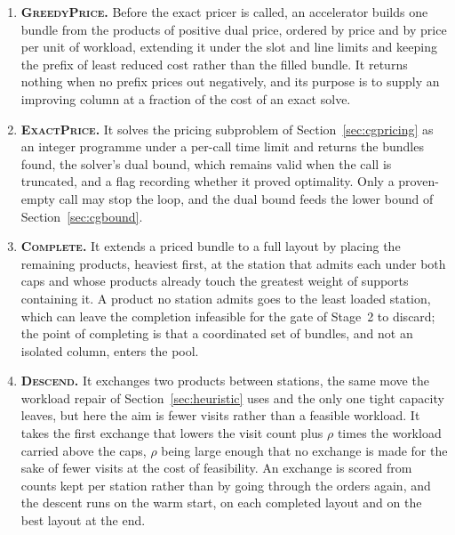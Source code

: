 \documentclass[]{interact}
\begin{document}
\begin{enumerate}
\item \textbf{\textsc{GreedyPrice}.} Before the exact pricer is called, an accelerator builds one bundle from the products of positive dual price, ordered by price and by price per unit of workload, extending it under the slot and line limits and keeping the prefix of least reduced cost rather than the filled bundle. It returns nothing when no prefix prices out negatively, and its purpose is to supply an improving column at a fraction of the cost of an exact solve.
\item \textbf{\textsc{ExactPrice}.} It solves the pricing subproblem of Section~\ref{sec:cgpricing} as an integer programme under a per-call time limit and returns the bundles found, the solver's dual bound, which remains valid when the call is truncated, and a flag recording whether it proved optimality. Only a proven-empty call may stop the loop, and the dual bound feeds the lower bound of Section~\ref{sec:cgbound}.
\item \textbf{\textsc{Complete}.} It extends a priced bundle to a full layout by placing the remaining products, heaviest first, at the station that admits each under both caps and whose products already touch the greatest weight of supports containing it. A product no station admits goes to the least loaded station, which can leave the completion infeasible for the gate of Stage~2 to discard; the point of completing is that a coordinated set of bundles, and not an isolated column, enters the pool.
\item \textbf{\textsc{Descend}.} It exchanges two products between stations, the same move the workload repair of Section~\ref{sec:heuristic} uses and the only one tight capacity leaves, but here the aim is fewer visits rather than a feasible workload. It takes the first exchange that lowers the visit count plus $\rho$ times the workload carried above the caps, $\rho$ being large enough that no exchange is made for the sake of fewer visits at the cost of feasibility. An exchange is scored from counts kept per station rather than by going through the orders again, and the descent runs on the warm start, on each completed layout and on the best layout at the end.
\end{enumerate}
\end{document}
